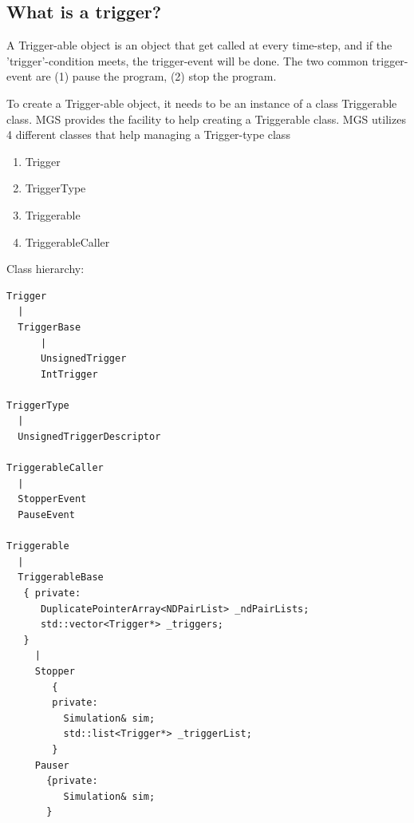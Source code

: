 \subsection{What is a trigger?}
\label{sec:Triggerable-MGS}

A Trigger-able object is an object that get called at every time-step, and 
if the 'trigger'-condition meets, the trigger-event will be done.
The two common trigger-event are (1) pause the program, (2) stop the program.

To create a Trigger-able object, it needs to be an instance of a class
Triggerable class.
MGS provides the facility to help creating a Triggerable class.
MGS utilizes 4 different classes that help managing a Trigger-type class
\begin{enumerate}
  \item Trigger
  \item TriggerType
  \item Triggerable
  \item TriggerableCaller
\end{enumerate}

Class hierarchy: 
\begin{verbatim}
Trigger
  |
  TriggerBase
      |
      UnsignedTrigger
      IntTrigger

TriggerType
  |
  UnsignedTriggerDescriptor
 
TriggerableCaller
  |
  StopperEvent
  PauseEvent

Triggerable
  |
  TriggerableBase
   { private:
      DuplicatePointerArray<NDPairList> _ndPairLists;
      std::vector<Trigger*> _triggers;
   }
     |
     Stopper
        {
        private:
          Simulation& sim;
          std::list<Trigger*> _triggerList;
        }
     Pauser
       {private:
          Simulation& sim;
       }
   
\end{verbatim}

